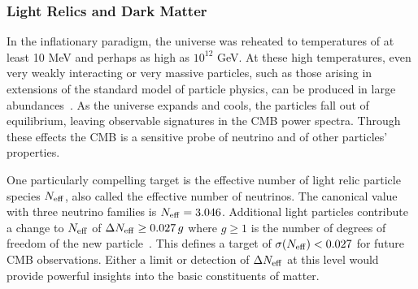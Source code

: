 
\vspace{-0.15in}

\subsubsection{Light Relics and Dark Matter}

\vspace{-0.05in}

In the inflationary paradigm, the universe was reheated to temperatures of at least 10 MeV and perhaps as high as $10^{12}$ GeV.  
At these high temperatures, even very weakly interacting or very massive particles, such as those arising 
in extensions of the standard model of particle physics, can be produced in large abundances~\cite{1979ARNPS..29..313S,Bolz:2000fu}.  As the universe expands and cools, 
the particles fall out of equilibrium, leaving observable signatures in the \ac{CMB} power spectra. 
Through these effects the CMB is a sensitive probe of neutrino and of other particles' properties.  

One particularly compelling target is the effective number of light relic particle species ${N_{\rm eff}}$, also called the effective 
number of neutrinos. The canonical value with three neutrino families is ${N_{\rm eff}} = 3.046$. Additional light particles 
contribute a change to ${N_{\rm eff}}$ of $\Delta {N_{\rm eff}} \geq 0.027\,g$ where $g \geq 1$ is the number of 
degrees of freedom of the new particle~\cite{Brust:2013xpv,Baumann:2016wac}.  
This defines a target of $\sigma({N_{\rm eff}}) < 0.027$ for future CMB observations. 
Either a limit or detection of $\Delta {N_{\rm eff}}$ at this level would provide powerful insights into the basic constituents 
of matter. 

